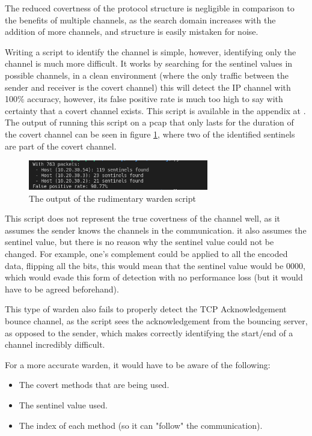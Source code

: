 The reduced covertness of the protocol structure is negligible in comparison to the benefits of multiple channels, as the search domain increases with the addition of more channels, and structure is easily mistaken for noise.

Writing a script to identify the channel is simple, however, identifying only the channel is much more difficult. It works by searching for the sentinel values in possible channels, in a clean environment (where the only traffic between the sender and receiver is the covert channel) this will detect the IP channel with 100\% accuracy, however, its false positive rate is much too high to say with certainty that a covert channel exists. This script is available in the appendix at . The output of running this script on a pcap that only lasts for the duration of the covert channel can be seen in figure \ref{fig:warden_output}, where two of the identified sentinels are part of the covert channel.

\begin{figure}[H]
    \centering
    \includegraphics[width=0.7\textwidth]{fig/rudimentary_warden.png}
    \caption{The output of the rudimentary warden script}
    \label{fig:warden_output}
\end{figure}

This script does not represent the true covertness of the channel well, as it assumes the sender knows the channels in the communication. it also assumes the sentinel value, but there is no reason why the sentinel value could not be changed. For example, one's complement could be applied to all the encoded data, flipping all the bits, this would mean that the sentinel value would be 0000, which would evade this form of detection with no performance loss (but it would have to be agreed beforehand).

This type of warden also fails to properly detect the TCP Acknowledgement bounce channel, as the script sees the acknowledgement from the bouncing server, as opposed to the sender, which makes correctly identifying the start/end of a channel incredibly difficult.

For a more accurate warden, it would have to be aware of the following:

\begin{itemize}
    \item The covert methods that are being used.
    \item The sentinel value used.
    \item The index of each method (so it can "follow" the communication).
\end{itemize}

